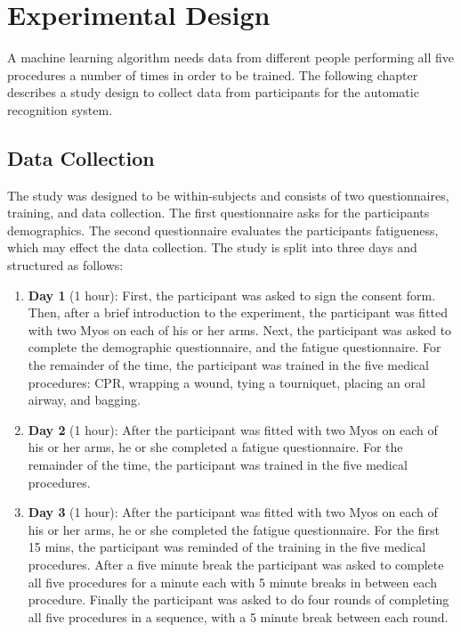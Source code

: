 \section{Experimental Design}
\label{sec:Experimental-Design}
A machine learning algorithm needs data from different people performing all five procedures a number of times in order to be trained. The following chapter describes a study design to collect data from participants for the automatic recognition system. 

\subsection{Data Collection}
\label{sec:Experimental-Design:Data-Collection}
The study was designed to be within-subjects and consists of two questionnaires, training, and data collection. The first questionnaire asks for the participants demographics. The second questionnaire evaluates the participants fatigueness, which may effect the data collection. The study is split into three days and structured as follows:
\begin{enumerate}
	\item \textbf{Day 1} (1 hour): First, the participant was asked to sign the consent form. Then, after a brief introduction to the experiment, the participant was fitted with two Myos on each of his or her arms. Next, the participant was asked to complete the demographic questionnaire, and the fatigue questionnaire. For the remainder of the time, the participant was trained in the five medical procedures: CPR, wrapping a wound, tying a tourniquet, placing an oral airway, and bagging.
	\item \textbf{Day 2} (1 hour): After the participant was fitted with two Myos on each of his or her arms, he or she completed a fatigue questionnaire. For the remainder of the time, the participant was trained in the five medical procedures.
	\item \textbf{Day 3} (1 hour): After the participant was fitted with two Myos on each of his or her arms, he or she completed the fatigue questionnaire. For the first 15 mins, the participant was reminded of the training in the five medical procedures.
	After a five minute break the participant was asked to complete all five procedures for a minute each with 5 minute breaks in between each procedure. Finally the participant was asked to do four rounds of completing all five procedures in a sequence, with a 5 minute break between each round.
\end{enumerate}

